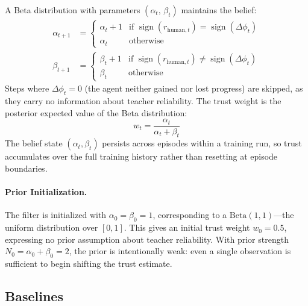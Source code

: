 \documentclass[11pt]{article}
\begin{document}
A Beta distribution with parameters $(\alpha_t,\, \beta_t)$ maintains the
belief:
\begin{align}
  \alpha_{t+1} &= \begin{cases}
    \alpha_t + 1 & \text{if } \operatorname{sign}(r_{\mathrm{human},t})
                              = \operatorname{sign}(\Delta\phi_t) \\[4pt]
    \alpha_t     & \text{otherwise}
  \end{cases}
  \label{eq:alpha_update} \\[6pt]
  \beta_{t+1}  &= \begin{cases}
    \beta_t + 1 & \text{if } \operatorname{sign}(r_{\mathrm{human},t})
                              \neq \operatorname{sign}(\Delta\phi_t) \\[4pt]
    \beta_t     & \text{otherwise}
  \end{cases}
  \label{eq:beta_update}
\end{align}
Steps where $\Delta\phi_t = 0$ (the agent neither gained nor lost progress)
are skipped, as they carry no information about teacher reliability. The trust
weight is the posterior expected value of the Beta distribution:
\begin{equation}
  w_t = \frac{\alpha_t}{\alpha_t + \beta_t}
  \label{eq:trust_weight}
\end{equation}
The belief state $(\alpha_t, \beta_t)$ persists across episodes within a
training run, so trust accumulates over the full training history rather than
resetting at episode boundaries.

\paragraph{Prior Initialization.}
The filter is initialized with $\alpha_0 = \beta_0 = 1$, corresponding to a
$\mathrm{Beta}(1,1)$---the uniform distribution over $[0,1]$. This gives an
initial trust weight $w_0 = 0.5$, expressing no prior assumption about teacher
reliability. With prior strength $N_0 = \alpha_0 + \beta_0 = 2$, the prior is
intentionally weak: even a single observation is sufficient to begin shifting
the trust estimate.

\subsection{Baselines}
\end{document}
